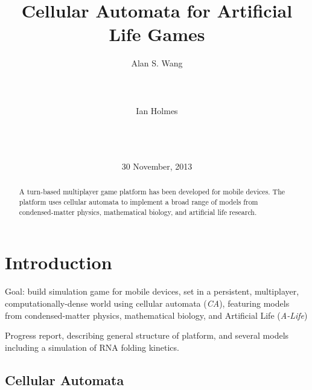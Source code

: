 \documentclass{acm_proc_article-sp}
\begin{document}
\title{Cellular Automata for Artificial Life Games}
\author{
\alignauthor
Alan S. Wang\\
       \\
       \\
       \\
\alignauthor
Ian Holmes\\
       \\
       \\
       \\
}
\date{30 November, 2013}

\maketitle
\begin{abstract}
A turn-based multiplayer game platform has been developed for mobile devices.
The platform uses cellular automata to implement a broad range of models
from condensed-matter physics, mathematical biology,
and artificial life research.
\end{abstract}



\section{Introduction}

Goal: 
build simulation game for mobile devices,
set in a persistent, multiplayer, computationally-dense world
using cellular automata ({\em CA}),
featuring models from
condensed-matter physics,
mathematical biology,
 and
Artificial Life ({\em A-Life})

Progress report, describing general structure of platform,
and several models including a simulation of RNA folding kinetics.

\subsection{Cellular Automata}
\end{document}
